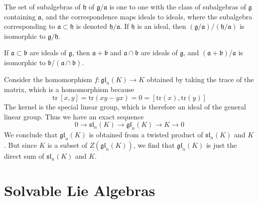 \begin{theorem}
    The set of subalgebras of $\mathfrak{h}$ of $\mathfrak{g}/\mathfrak{a}$ is one to one with the class of subalgebras of $\mathfrak{g}$ containing $\mathfrak{a}$, and the correspondence maps ideals to ideals, where the subalgebra corresponding to $\mathfrak{a} \subset \mathfrak{h}$ is denoted $\mathfrak{h}/\mathfrak{a}$. If $\mathfrak{h}$ is an ideal, then $(\mathfrak{g}/\mathfrak{a})/(\mathfrak{h}/\mathfrak{a})$ is isomorphic to $\mathfrak{g}/\mathfrak{h}$.
\end{theorem}

\begin{theorem}
    If $\mathfrak{a} \subset \mathfrak{b}$ are ideals of $\mathfrak{g}$, then $\mathfrak{a} + \mathfrak{b}$ and $\mathfrak{a} \cap \mathfrak{b}$ are ideals of $\mathfrak{g}$, and $(\mathfrak{a} + \mathfrak{b})/\mathfrak{a}$ is isomorphic to $\mathfrak{b}/(\mathfrak{a} \cap \mathfrak{b})$.
\end{theorem}

\begin{example}
    Consider the homomorphism $f: \mathfrak{gl}_n(K) \to K$ obtained by taking the trace of the matrix, which is a homomorphism because
    \[ \text{tr}\ [x,y] = \text{tr}(xy - yx) = 0 = [\text{tr}(x), \text{tr}(y)] \]
    The kernel is the special linear group, which is therefore an ideal of the general linear group. Thus we have an exact sequence
    \[ 0 \to \mathfrak{sl}_n(K) \to \mathfrak{gl}_n(K) \to K \to 0 \]
    We conclude that $\mathfrak{gl}_n(K)$ is obtained from a twisted product of $\mathfrak{sl}_n(K)$ and $K$. But since $K$ is a subset of $Z(\mathfrak{gl}_n(K))$, we find that $\mathfrak{gl}_n(K)$ is just the direct sum of $\mathfrak{sl}_n(K)$ and $K$.
\end{example}





\section{Solvable Lie Algebras}

